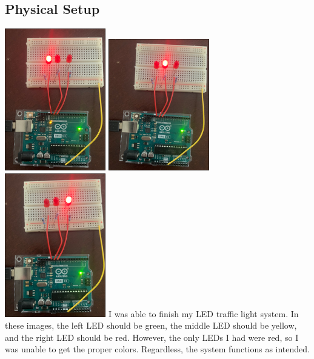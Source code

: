 \documentclass[12pt]{article}
\begin{document}
\subsection{Physical Setup}
\includegraphics[width=0.33\textwidth]{PhysicalTrafficLightOne.png}
\includegraphics[width=0.33\textwidth]{PhysicalTrafficLightTwo.png}
\includegraphics[width=0.33\textwidth]{PhysicalTrafficLightThree.png}
I was able to finish my LED traffic light system. In these images, the left LED should be green, the middle LED should be yellow, and the right LED should be red. 
However, the only LEDs I had were red, so I was unable to get the proper colors. Regardless, the system functions as intended. 
\end{document}
